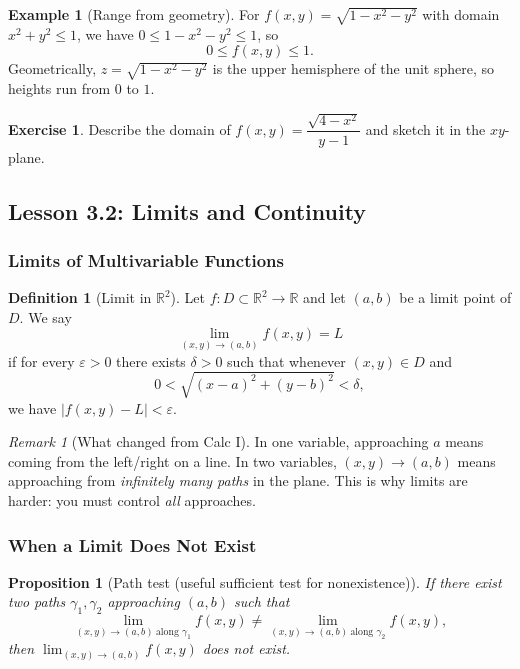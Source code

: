\documentclass[12pt]{article}
\numberwithin{equation}{section}
\newcommand{\RR}{\mathbb{R}}
\theoremstyle{plain}
\newtheorem{proposition}[theorem]{Proposition}
\theoremstyle{definition}
\newtheorem{definition}[theorem]{Definition}
\newtheorem{example}[theorem]{Example}
\newtheorem{exercise}[theorem]{Exercise}
\theoremstyle{remark}
\newtheorem{remark}[theorem]{Remark}
\begin{document}
\begin{example}[Range from geometry]
For $f(x,y)=\sqrt{1-x^2-y^2}$ with domain $x^2+y^2\le 1$, we have $0\le 1-x^2-y^2\le 1$, so
\[
0\le f(x,y)\le 1.
\]
Geometrically, $z=\sqrt{1-x^2-y^2}$ is the upper hemisphere of the unit sphere, so heights run from $0$ to $1$.
\end{example}

\begin{exercise}
Describe the domain of $f(x,y)=\dfrac{\sqrt{4-x^2}}{y-1}$ and sketch it in the $xy$-plane.
\end{exercise}

\subsection{Lesson 3.2: Limits and Continuity}

\subsubsection{Limits of Multivariable Functions}

\begin{definition}[Limit in $\RR^2$]\label{def:limitR2}
Let $f:D\subset\RR^2\to\RR$ and let $(a,b)$ be a limit point of $D$. We say
\[
\lim_{(x,y)\to(a,b)} f(x,y)=L
\]
if for every $\varepsilon>0$ there exists $\delta>0$ such that whenever $(x,y)\in D$ and
\[
0<\sqrt{(x-a)^2+(y-b)^2}<\delta,
\]
we have $|f(x,y)-L|<\varepsilon$.
\end{definition}

\begin{remark}[What changed from Calc I]
In one variable, approaching $a$ means coming from the left/right on a line.  
In two variables, $(x,y)\to(a,b)$ means approaching from \emph{infinitely many paths} in the plane. This is why limits are harder: you must control \emph{all} approaches.
\end{remark}

\subsubsection{When a Limit Does Not Exist}

\begin{proposition}[Path test (useful sufficient test for nonexistence)]\label{prop:path-test}
If there exist two paths $\gamma_1,\gamma_2$ approaching $(a,b)$ such that
\[
\lim_{(x,y)\to(a,b)\ \text{along }\gamma_1} f(x,y)\neq
\lim_{(x,y)\to(a,b)\ \text{along }\gamma_2} f(x,y),
\]
then $\lim_{(x,y)\to(a,b)} f(x,y)$ does not exist.
\end{proposition}
\end{document}
